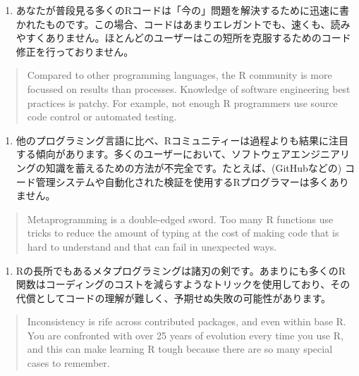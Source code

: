 \documentclass[
  a4paper,
  pandoc,
  ja=standard,
  jafont=haranoaji]{bxjsbook}
\providecommand{\tightlist}{%
  \setlength{\itemsep}{0pt}\setlength{\parskip}{0pt}}
\begin{document}
\begin{enumerate}
\def\labelenumi{\arabic{enumi}.}
\tightlist
\item
  あなたが普段見る多くのRコードは「今の」問題を解決するために迅速に書かれたものです。この場合、コードはあまりエレガントでも、速くも、読みやすくありません。ほとんどのユーザーはこの短所を克服するためのコード修正を行っておりません。
\end{enumerate}

\begin{quote}
Compared to other programming languages, the R community is more
focussed on results than processes. Knowledge of software engineering
best practices is patchy. For example, not enough R programmers use
source code control or automated testing.
\end{quote}

\begin{enumerate}
\def\labelenumi{\arabic{enumi}.}
\setcounter{enumi}{1}
\tightlist
\item
  他のプログラミング言語に比べ、Rコミュニティーは過程よりも結果に注目する傾向があります。多くのユーザーにおいて、ソフトウェアエンジニアリングの知識を蓄えるための方法が不完全です。たとえば、(GitHubなどの)
  コード管理システムや自動化された検証を使用するRプログラマーは多くありません。
\end{enumerate}

\begin{quote}
Metaprogramming is a double-edged sword. Too many R functions use tricks
to reduce the amount of typing at the cost of making code that is hard
to understand and that can fail in unexpected ways.
\end{quote}

\begin{enumerate}
\def\labelenumi{\arabic{enumi}.}
\setcounter{enumi}{2}
\tightlist
\item
  Rの長所でもあるメタプログラミングは諸刃の剣です。あまりにも多くのR関数はコーディングのコストを減らすようなトリックを使用しており、その代償としてコードの理解が難しく、予期せぬ失敗の可能性があります。
\end{enumerate}

\begin{quote}
Inconsistency is rife across contributed packages, and even within base
R. You are confronted with over 25 years of evolution every time you use
R, and this can make learning R tough because there are so many special
cases to remember.
\end{quote}
\end{document}
